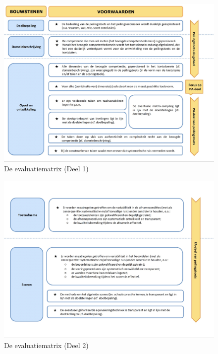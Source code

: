 \documentclass[
  letterpaper,
]{report}
\begin{document}
\begin{figure}

{\centering \includegraphics{./FIG10_1.jpg}

}

\caption{\label{fig-figuur10_1}De evaluatiematrix (Deel 1)}

\end{figure}

\begin{figure}

{\centering \includegraphics{./FIG10_2.jpg}

}

\caption{\label{fig-figuur10_2}De evaluatiematrix (Deel 2)}

\end{figure}
\end{document}

